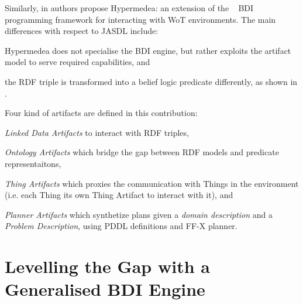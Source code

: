 \documentclass[
]{ceurart}
\begin{document}
Similarly, 
in \cite{DBLP:conf/www/CharpenayZLB22} authors propose Hypermedea: 
an extension of the \jacamo{}~\cite{BOISSIER2013747} \ac{BDI} programming framework
for interacting with \ac{WoT} environments.
%
The main differences with respect to JASDL include:
\begin{inlinelist}
\item Hypermedea does not specialise the \ac{BDI} engine, 
but rather exploits the \cartago{} artifact model to serve required capabilities, and
\item the \ac{RDF} triple is transformed into a belief logic predicate differently, as shown in .
\end{inlinelist} 
%
Four kind of artifacts are defined in this contribution: 
\begin{inlinelist}
  \item \textit{Linked Data Artifacts} to interact with \ac{RDF} triples,
  \item \textit{Ontology Artifacts} which bridge the gap between \ac{RDF} models and predicate representaitons,
  \item \textit{Thing Artifacts} which proxies the communication with Things in the environment (i.e. each Thing its own Thing Artifact to interact with it), and
  \item \textit{Planner Artifacts} which synthetize plans given a \textit{domain description} and a \textit{Problem Description}, using PDDL definitions and FF-X planner. 
\end{inlinelist}






\section{Levelling the Gap with a Generalised BDI Engine}
\label{sec:generalized-bdi-engine}
\end{document}
